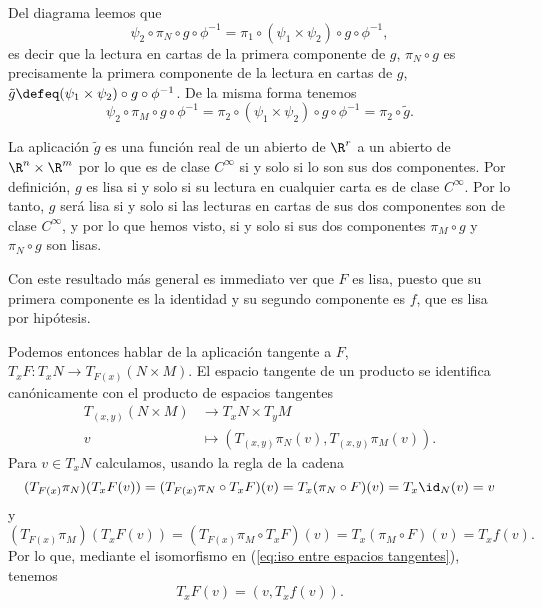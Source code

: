 \documentclass[12pt]{article}
\begin{document}
Del diagrama leemos que
\begin{equation*}
	\psi_2 \circ \pi_N \circ g \circ \phi^{-1} = \pi_1 \circ (\psi_1 \times \psi_2) \circ g
	\circ \phi^{-1},
\end{equation*}
es decir que la lectura en cartas de la primera componente de \( g \), \( \pi_N \circ g \)
es precisamente la primera componente de la lectura en cartas de \( g \), \( \tilde{g}
\defeq (\psi_1 \times \psi_2) \circ g \circ \phi^{-1} \). De la misma forma tenemos
\begin{equation*}
	\psi_2 \circ \pi_M \circ g \circ \phi^{-1} = \pi_2 \circ (\psi_1 \times \psi_2) \circ g
	\circ \phi^{-1} = \pi_2 \circ \tilde{g}.
\end{equation*}

La aplicación \( \tilde{g} \) es una función real de un abierto de \( \R^r \) a un abierto
de \( \R^n \times \R^m \) por lo que es de clase \( C^\infty \) si y solo si lo son sus
dos componentes. Por definición, \( g \) es lisa si y solo si su lectura en cualquier carta es de
clase \( C^\infty \). Por lo tanto, \( g \) será lisa si y solo si las lecturas en
cartas de sus dos componentes son de clase \( C^{\infty} \), y por lo que hemos visto, si
y solo si sus dos componentes \( \pi_M \circ g \) y \( \pi_N \circ g \) son lisas. 

Con este resultado más general es immediato ver que \( F \) es lisa, puesto que su
primera componente es la identidad y su segundo componente es \( f \), que es lisa por
hipótesis.

\parbreak
 
Podemos entonces hablar de la aplicación tangente a \( F \), \( T_x F \colon T_x N \to
T_{F(x)}(N \times M) \). El espacio tangente de un producto se identifica canónicamente
con el producto de espacios tangentes
\begin{equation}\label{eq:iso entre espacios tangentes}
	\begin{aligned}
		T_{(x,y)}(N \times M) & \longrightarrow T_x N \times T_y M \\
		v & \longmapsto (T_{(x,y)} \pi_N(v), T_{(x,y)}\pi_M (v)).
	\end{aligned}
\end{equation}
Para \( v \in T_x N \) calculamos, usando la regla de la cadena
\begin{equation*}
	(T_{F(x)} \pi_N)(T_xF(v)) = (T_{F(x)}\pi_N \circ T_xF)(v) = T_x(\pi_N \circ F)(v) =
	T_x\id_N(v) = v
\end{equation*}
y
\begin{equation*}
	(T_{F(x)} \pi_M)(T_xF(v)) = (T_{F(x)}\pi_M \circ T_xF)(v) = T_x(\pi_M \circ F)(v) =
	T_xf(v).
\end{equation*}
Por lo que, mediante el isomorfismo en (\ref{eq:iso entre espacios tangentes}), tenemos
\begin{equation*}
	T_xF(v) = (v, T_xf(v)).
\end{equation*}
\end{document}
